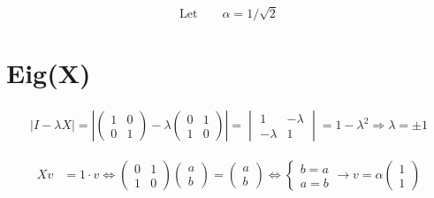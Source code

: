 \documentclass[12pt]{article}
\begin{document}
\begin{equation*}
\mbox{Let} \qquad \alpha = 1/ \sqrt{2}
\end{equation*}


\section{Eig(X)}

\begin{equation*}
\begin{aligned}
| I - \lambda X |
=
\left|
\begin{pmatrix}
1 & 0 \\ 
0 & 1 
\end{pmatrix}
- \lambda
\begin{pmatrix}
0 & 1 \\ 
1 & 0 
\end{pmatrix}
\right|
=
\begin{vmatrix}
1 & -\lambda \\ 
-\lambda & 1 
\end{vmatrix}
= 1 - \lambda^2
\Rightarrow
\lambda = \pm 1
\end{aligned}
\end{equation*}


\begin{equation*}
\begin{aligned}
Xv & = 1 \cdot v \Leftrightarrow 
\begin{pmatrix}
0 & 1 \\ 
1 & 0 
\end{pmatrix}
\begin{pmatrix}
a \\ 
b 
\end{pmatrix}
=
\begin{pmatrix}
a \\ 
b 
\end{pmatrix}
\Leftrightarrow 
\begin{cases}
b = a \\
a = b
\end{cases}
\rightarrow
v = 
\alpha
\begin{pmatrix}
1 \\ 
1 
\end{pmatrix}
\end{aligned}
\end{equation*}

\end{document}

